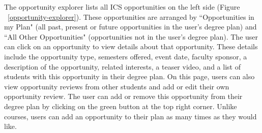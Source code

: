 The opportunity explorer lists all ICS opportunities on the left side (Figure ~\ref{opportunity-explorer}). These opportunities are arranged by ``Opportunities in my Plan" (all past, present or future opportunities in the user's degree plan) and ``All Other Opportunities" (opportunities not in the user's degree plan). The user can click on an opportunity to view details about that opportunity. These details include the opportunity type, semesters offered, event date, faculty sponsor, a description of the opportunity, related interests, a teaser video, and a list of students with this opportunity in their degree plan. On this page, users can also view opportunity reviews from other students and add or edit their own opportunity review. The user can add or remove this opportunity from their degree plan by clicking on the green button at the top right corner. Unlike courses, users can add an opportunity to their plan as many times as they would like.

